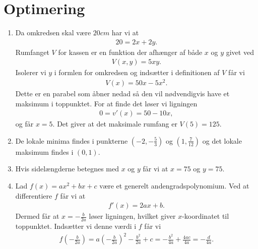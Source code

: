 \section{Optimering}
\begin{enumerate}
	
	
	\item Da omkredsen skal være $20cm$ har vi at
	\begin{align*}
	20=2x+2y.
	\end{align*}
	Rumfanget $V$ for kassen er en funktion der afhænger af både $x$ og $y$ givet ved
	\begin{align*}
	V(x,y)=5xy.
	\end{align*}
	Isolerer vi $y$ i formlen for omkredsen og indsætter i definitionen af $V$ får vi
	\begin{align*}
	V(x)=50x-5x^2.
	\end{align*}
	Dette er en parabel som åbner nedad så den vil nødvendigvis have et maksimum i toppunktet. For at finde det løser vi ligningen
	\begin{align*}
	0=v'(x)=50-10x,
	\end{align*}
	og får $x=5$. Det giver at det maksimale rumfang er $ V(5)=125 $.
	
	\item De lokale minima findes i punkterne $(-2,-\frac{5}{3})$ og $(1,\frac{7}{12})$ og det lokale maksimum findes i $(0,1)$.
	
	\item Hvis sidelængderne betegnes med $x$ og $y$ får vi at $x=75$ og $y=75$.
	
	\item Lad $f(x)=ax^2+bx+c$ være et generelt andengradspolynomium. Ved at differentiere $f$ får vi at
	\begin{align*}
	f'(x)=2ax+b.
	\end{align*}
	Dermed får at $x=-\frac{b}{2a}$ løser ligningen, hvilket giver $x$-koordinatet til toppunktet. Indsætter vi denne værdi i $f$ får vi
	\begin{align*}
	f(-\frac{b}{2a})=a(-\frac{b}{2a})^2-\frac{b^2}{2a}+c=-\frac{b^2}{4a}+\frac{4ac}{4a}=-\frac{d}{4a}.
	\end{align*}
	

\end{enumerate}
